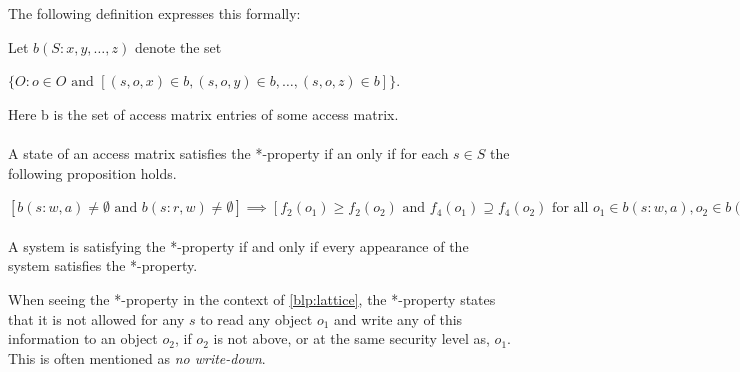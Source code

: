 The following definition expresses this formally:
\begin{definition}
Let $b(S:x,y, \dots, z)$ denote the set 

$\{O: o \in O \text{ and } [(s,o,x) \in b, (s,o,y) \in b, \dots, (s,o,z) \in b]\}$.

Here b is the set of access matrix entries of some access matrix.

\paragraph{}
\noindent{} 
A state of an access matrix satisfies the *-property if an only if for each $s \in S$ the following proposition holds.

$[b(s:w,a) \ne \emptyset \text{ and } b(s:r,w) \ne \emptyset] \implies [f_2(o_1) \ge f_2(o_2) \text{ and } f_4(o_1) \supseteq f_4(o_2) \text{ for all } o_1 \in b(s:w,a), o_2 \in b(s:r,w)]$

\paragraph{}
\noindent{} 
A system is satisfying the *-property if and only if every appearance of the system satisfies the *-property.
\end{definition}

When seeing the *-property in the context of \cref{blp:lattice}, the *-property states that it is not allowed for any \ssubject{} $s$ to read any object $o_1$ and write any of this information to an object $o_2$, if $o_2$ is not above, or at the same security level as, $o_1$.
This is often mentioned as \emph{no write-down}.
